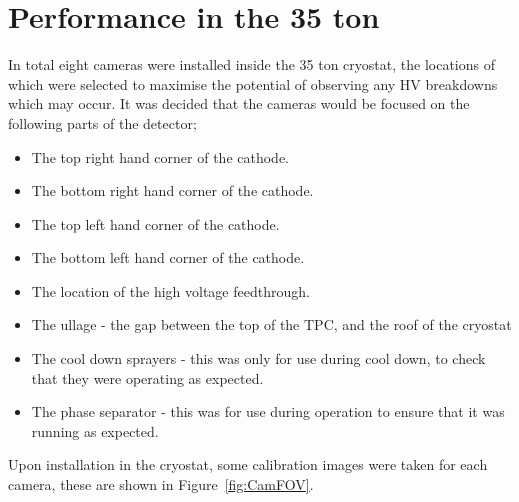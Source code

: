 \section{Performance in the 35 ton}  %
In total eight cameras were installed inside the 35 ton cryostat, the locations of which were selected to maximise the potential of observing any HV breakdowns which may occur. It was decided that the cameras would be focused on the following parts of the detector;
\begin{itemize}
\item The top right hand corner of the cathode.
\item The bottom right hand corner of the cathode.
\item The top left hand corner of the cathode.
\item The bottom left hand corner of the cathode.
\item The location of the high voltage feedthrough.
\item The ullage - the gap between the top of the TPC, and the roof of the cryostat
\item The cool down sprayers - this was only for use during cool down, to check that they were operating as expected.
\item The phase separator - this was for use during operation to ensure that it was running as expected.
\end{itemize}
Upon installation in the cryostat, some calibration images were taken for each camera, these are shown in Figure~\ref{fig:CamFOV}. \\

